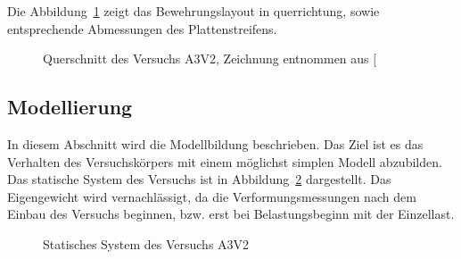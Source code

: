 \documentclass[
  11pt,
  letterpaper,
]{scrreprt}
\begin{document}
Die Abbildung~\ref{fig-qs_a3v2} zeigt das Bewehrungslayout in
querrichtung, sowie entsprechende Abmessungen des Plattenstreifens.

\begin{figure}[H]


\caption{\label{fig-qs_a3v2}Querschnitt des Versuchs A3V2, Zeichnung
entnommen aus {[}\citeproc{ref-gitz_ansatze_2024}{1}{]}}

\end{figure}%

\subsection{Modellierung}\label{modellierung}

In diesem Abschnitt wird die Modellbildung beschrieben. Das Ziel ist es
das Verhalten des Versuchskörpers mit einem möglichst simplen Modell
abzubilden. Das statische System des Versuchs ist in
Abbildung~\ref{fig-system_a3v2} dargestellt. Das Eigengewicht wird
vernachlässigt, da die Verformungsmessungen nach dem Einbau des Versuchs
beginnen, bzw. erst bei Belastungsbeginn mit der Einzellast.

\begin{figure}[H]


\caption{\label{fig-system_a3v2}Statisches System des Versuchs A3V2}

\end{figure}%
\end{document}
